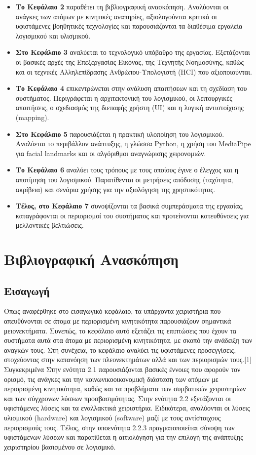 \documentclass[twoside, a4paper, 11pt]{article}
\begin{document}
\begin{itemize}
    \item \textbf{Το Κεφάλαιο 2} παραθέτει τη βιβλιογραφική ανασκόπηση. Αναλύονται οι ανάγκες των ατόμων με κινητικές αναπηρίες, αξιολογούνται κριτικά οι υφιστάμενες βοηθητικές τεχνολογίες και παρουσιάζονται τα διαθέσιμα εργαλεία λογισμικού και υλισμικού.
    \item \textbf{Στο Κεφάλαιο 3} αναλύεται το τεχνολογικό υπόβαθρο της εργασίας. Εξετάζονται οι βασικές αρχές της Επεξεργασίας Εικόνας, της Τεχνητής Νοημοσύνης, καθώς και οι τεχνικές Αλληλεπίδρασης Ανθρώπου-Υπολογιστή (HCI) που αξιοποιούνται.
    \item \textbf{Το Κεφάλαιο 4} επικεντρώνεται στην ανάλυση απαιτήσεων και τη σχεδίαση του συστήματος. Περιγράφεται η αρχιτεκτονική του λογισμικού, οι λειτουργικές απαιτήσεις, ο σχεδιασμός της διεπαφής χρήστη (UI) και η λογική αντιστοίχισης (mapping).
    \item \textbf{Στο Κεφάλαιο 5} παρουσιάζεται η πρακτική υλοποίηση του λογισμικού. Αναλύεται το περιβάλλον ανάπτυξης, η γλώσσα Python, η χρήση του MediaPipe για facial landmarks και οι αλγόριθμοι αναγνώρισης χειρονομιών.
    \item \textbf{Το Κεφάλαιο 6} αναλύει τους τρόπους με τους οποίους έγινε ο έλεγχος και η αποτίμηση του λογισμικού. Παρατίθενται οι μετρήσεις απόδοσης (ταχύτητα, ακρίβεια) και σενάρια χρήσης για την αξιολόγηση της χρηστικότητας.
    \item \textbf{Τέλος, στο Κεφάλαιο 7} συνοψίζονται τα βασικά συμπεράσματα της εργασίας, καταγράφονται οι περιορισμοί του συστήματος και προτείνονται κατευθύνσεις για μελλοντικές βελτιώσεις.
\end{itemize}

\clearpage
\section{Βιβλιογραφική Ανασκόπηση}
\subsection{Εισαγωγή}
Όπως αναφέρθηκε στο εισαγωγικό κεφάλαιο, τα υπάρχοντα χειριστήρια που απευθύνονται 
σε άτομα με περιορισμένη κινητικότητα παρουσιάζουν σημαντικά μειονεκτήματα. 
Συνεπώς, το κεφάλαιο αυτό εξετάζει τις επιπτώσεις που έχουν τα συστήματα αυτά στα άτομα με περιορισμένη κινητικότητα, 
με σκοπό την ανάδειξη των αναγκών τους. Στη συνέχεια, το κεφάλαιο αναλύει τις υφιστάμενες προσεγγίσεις, στοχεύοντας στην κατανόηση των πλεονεκτημάτων αλλά και των περιορισμών τους.[1]
​Συγκεκριμένα Στην ενότητα 2.1 παρουσιάζονται βασικές έννοιες που αφορούν τον ορισμό, τις ανάγκες και την κοινωνικοοικονομική διάσταση των ατόμων με περιορισμένη κινητικότητα, καθώς και τα προβλήματα των συμβατικών χειριστηρίων και των σύγχρονων λύσεων προσβασιμότητας. Στην ενότητα 2.2 εξετάζονται οι υφιστάμενες λύσεις και τα εναλλακτικά χειριστήρια. Ειδικότερα, αναλύονται οι λύσεις υλισμικού (hardware) και λογισμικού (software) μαζί με τους αντίστοιχους περιορισμούς τους. Τέλος, στην υποενότητα 2.2.3 πραγματοποιείται σύνοψη των υφιστάμενων λύσεων και παρατίθεται η αιτιολόγηση για την επιλογή της ανάπτυξης χειριστηρίου βασισμένου σε λογισμικό.
\end{document}
